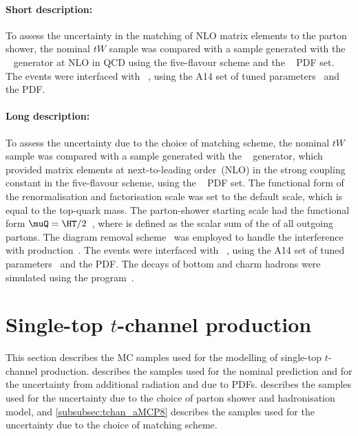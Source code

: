 \paragraph{Short description:}

To assess the uncertainty in the matching of NLO matrix elements to the
parton shower, the nominal $tW$ sample was compared with a sample generated
with the \MGNLO[2.6.2]~\cite{Alwall:2014hca} generator at NLO in QCD using the five-flavour
scheme and the \NNPDF[2.3nlo]~\cite{Ball:2014uwa} PDF set. The events were
interfaced with \PYTHIA[8.230]~\cite{Sjostrand:2014zea}, using the A14
set of tuned parameters~\cite{ATL-PHYS-PUB-2014-021} and the \NNPDF[2.3lo]
PDF.


\paragraph{Long description:}

To assess the uncertainty due to the choice of matching scheme, the nominal $tW$ sample was compared with a sample generated
with the \MGNLO[2.6.2]~\cite{Alwall:2014hca} generator, which provided matrix elements at next-to-leading order~(NLO) in the strong coupling constant \alphas
in the five-flavour scheme, using the \NNPDF[2.3nlo]~\cite{Ball:2014uwa} PDF set.
The functional form of the renormalisation and factorisation scale was set to the default scale, which is equal to the top-quark mass.
The parton-shower starting scale had the functional form $\muQ = \HT/2$~\cite{ATL-PHYS-PUB-2017-007}, 
where \HT is defined as the scalar sum of the \pT of all outgoing partons.
The diagram removal scheme~\cite{Frixione:2008yi} was employed to handle the interference with \ttbar production~\cite{ATL-PHYS-PUB-2016-020}.
The events were interfaced with \PYTHIA[8.230]~\cite{Sjostrand:2014zea}, using the A14 set of tuned parameters~\cite{ATL-PHYS-PUB-2014-021} 
and the \NNPDF[2.3lo] PDF.
The decays of bottom and charm hadrons were simulated using the \EVTGEN[1.6.0] program~\cite{Lange:2001uf}.


\section{Single-top \texorpdfstring{$t$}{t}-channel production}
\label{subsec:tchan}

This section describes the MC samples used for the modelling of single-top $t$-channel production.
 describes the \POWPY[8] samples used for the nominal prediction
and for the uncertainty from additional radiation and due to PDFs.
 describes the \POWHER[7] samples used for the uncertainty due to the choice of parton shower and hadronisation model,
and \cref{subsubsec:tchan_aMCP8} describes the \MGNLOPY[8] samples used for the uncertainty due to the choice of matching scheme.

